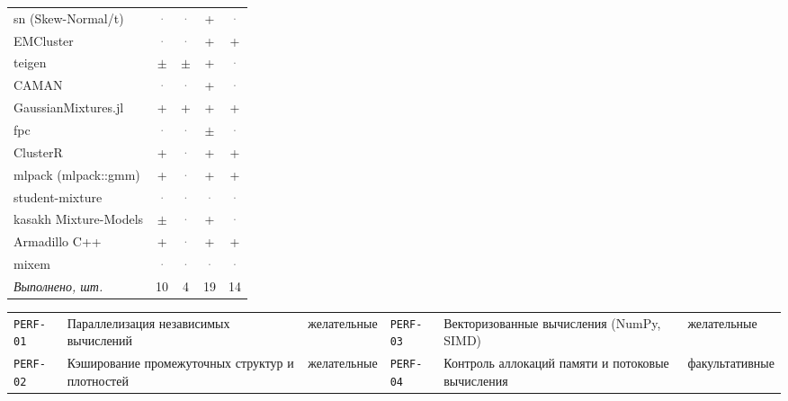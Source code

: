 \documentclass[10pt,a4paper]{article}
\begin{document}
\begin{landscape}
{\begin{longtable}{@{}l *{4}{c}@{}}
sn (Skew-Normal/t) & \textcolor{gray}{·} & \textcolor{gray}{·} & \cellcolor{yes!35}+ & \textcolor{gray}{·} \\
EMCluster & \textcolor{gray}{·} & \textcolor{gray}{·} & \cellcolor{yes!35}+ & \cellcolor{yes!35}+ \\
teigen & \cellcolor{part!45}$\pm$ & \cellcolor{part!45}$\pm$ & \cellcolor{yes!35}+ & \textcolor{gray}{·} \\
CAMAN & \textcolor{gray}{·} & \textcolor{gray}{·} & \cellcolor{yes!35}+ & \textcolor{gray}{·} \\
GaussianMixtures.jl & \cellcolor{yes!35}+ & \cellcolor{yes!35}+ & \cellcolor{yes!35}+ & \cellcolor{yes!35}+ \\
fpc & \textcolor{gray}{·} & \textcolor{gray}{·} & \cellcolor{part!45}$\pm$ & \textcolor{gray}{·} \\
ClusterR & \cellcolor{yes!35}+ & \textcolor{gray}{·} & \cellcolor{yes!35}+ & \cellcolor{yes!35}+ \\
mlpack (mlpack::gmm) & \cellcolor{yes!35}+ & \textcolor{gray}{·} & \cellcolor{yes!35}+ & \cellcolor{yes!35}+ \\
student-mixture & \textcolor{gray}{·} & \textcolor{gray}{·} & \textcolor{gray}{·} & \textcolor{gray}{·} \\
kasakh Mixture-Models & \cellcolor{part!45}$\pm$ & \textcolor{gray}{·} & \cellcolor{yes!35}+ & \textcolor{gray}{·} \\
Armadillo C++ & \cellcolor{yes!35}+ & \textcolor{gray}{·} & \cellcolor{yes!35}+ & \cellcolor{yes!35}+ \\
mixem & \textcolor{gray}{·} & \textcolor{gray}{·} & \textcolor{gray}{·} & \textcolor{gray}{·} \\
\midrule \textit{Выполнено, шт.} & 10 & 4 & 19 & 14 \\
\bottomrule
\end{longtable}}
{\scriptsize\setlength{\tabcolsep}{3pt}
\begin{tabular}{@{}l >{\raggedright\arraybackslash}p{7.4cm} l l >{\raggedright\arraybackslash}p{7.4cm} l@{}}
\texttt{PERF-01} & Параллелизация независимых вычислений & желательные & \texttt{PERF-03} & Векторизованные вычисления (NumPy, SIMD) & желательные \\
\texttt{PERF-02} & Кэширование промежуточных структур и плотностей & желательные & \texttt{PERF-04} & Контроль аллокаций памяти и потоковые вычисления & факультативные \\
\end{tabular}}


\end{landscape}
\end{document}
